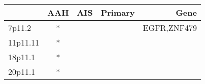 \begin{tabular}{lcccr}
\toprule
{} & AAH & AIS & Primary &         Gene \\
\midrule
7p11.2   &   * &     &         &  EGFR,ZNF479 \\
11p11.11 &   * &     &         &              \\
18p11.1  &   * &     &         &              \\
20p11.1  &   * &     &         &              \\
\bottomrule
\end{tabular}

